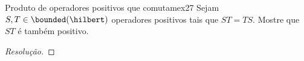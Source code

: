 \begin{exercício}{Produto de operadores positivos que comutam}{ex27}
    Sejam \(S, T \in \bounded(\hilbert)\) operadores positivos tais que \(ST = TS.\) Mostre que \(ST\) é também positivo.
\end{exercício}
\begin{proof}[Resolução]

\end{proof}
